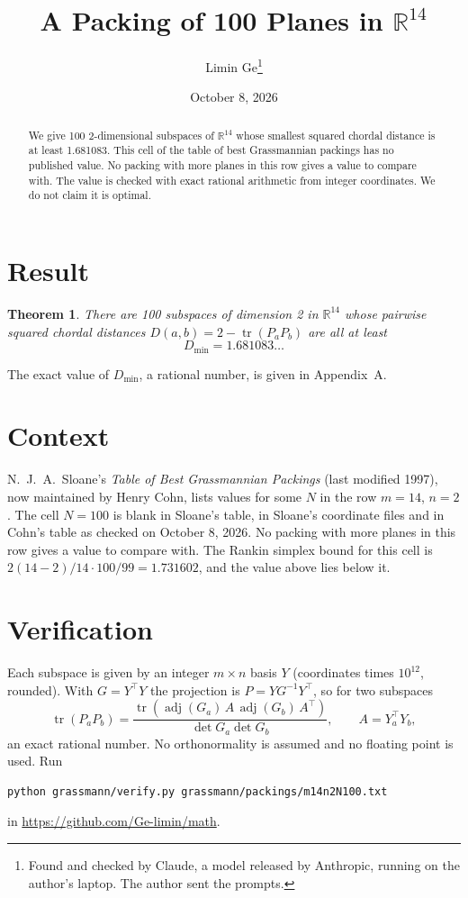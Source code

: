 \documentclass[11pt,a4paper]{article}
\title{A Packing of 100 Planes in $\mathbb{R}^{14}$}
\author{Limin Ge\thanks{Found and checked by Claude, a model released by Anthropic, running on the author's laptop. The author sent the prompts.}}
\date{October 8, 2026}
\newtheorem*{theorem}{Theorem}
\begin{document}
\maketitle
\begin{abstract}
We give 100 2-dimensional subspaces of $\mathbb{R}^{14}$ whose smallest squared chordal distance is at least 1.681083. This cell of the table of best Grassmannian packings has no published value. No packing with more planes in this row gives a value to compare with. The value is checked with exact rational arithmetic from integer coordinates. We do not claim it is optimal.
\end{abstract}

\section{Result}
\begin{theorem}
There are 100 subspaces of dimension 2 in $\mathbb{R}^{14}$ whose pairwise squared chordal distances $D(a,b) = 2 - \operatorname{tr}(P_aP_b)$ are all at least
\[ D_{\min} = 1.681083\ldots \]
\end{theorem}
The exact value of $D_{\min}$, a rational number, is given in Appendix~A.


\section{Context}
N.~J.~A.~Sloane's \emph{Table of Best Grassmannian Packings} (last modified 1997), now maintained by Henry Cohn, lists values for some $N$ in the row $m=14$, $n=2$. The cell $N=100$ is blank in Sloane's table, in Sloane's coordinate files and in Cohn's table as checked on October 8, 2026. No packing with more planes in this row gives a value to compare with. The Rankin simplex bound for this cell is $2(14-2)/14\cdot 100/99 = 1.731602$, and the value above lies below it.


\section{Verification}
Each subspace is given by an integer $m\times n$ basis $Y$ (coordinates times $10^{12}$, rounded). With $G=Y^\top Y$ the projection is $P=YG^{-1}Y^\top$, so for two subspaces
\[ \operatorname{tr}(P_aP_b)=\frac{\operatorname{tr}(\operatorname{adj}(G_a)\,A\,\operatorname{adj}(G_b)\,A^\top)}{\det G_a\det G_b},\qquad A=Y_a^\top Y_b, \]
an exact rational number. No orthonormality is assumed and no floating point is used. Run
\begin{verbatim}
python grassmann/verify.py grassmann/packings/m14n2N100.txt
\end{verbatim}
in \url{https://github.com/Ge-limin/math}.
\end{document}
